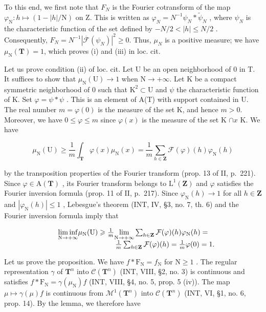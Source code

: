 To this end, we first note that \(F_{N}\) is the Fourier cotransform of the map \(\varphi_{\mathrm{N}}\colon h\mapsto(1-|h|/\mathrm{N})\) on Z. This is written as \(\varphi_{N}=N^{-1}\psi_{N}*\widetilde{\psi}_{N}\) , where \(\psi_{N}\) is the characteristic function of the set defined by \(-N/2<|h|\leqslant N/2\) . Consequently, \(F_{N}=N^{-1}|\overline{\mathcal{F}}(\psi_{N})|^{2}\geqslant0\). Thus, \(\mu_{N}\) is a positive measure; we have \(\mu_{\mathrm{N}}(\mathbf{T})=1\), which proves (i) and (iii) in loc. cit.

Let us prove condition (ii) of loc. cit. Let U be an open neighborhood of 0 in T. It suffices to show that \(\mu_{\mathrm{N}}(\mathrm{U}) \to 1\) when \(\mathrm{N} \to +\infty\). Let K be a compact symmetric neighborhood of 0 such that \(\mathrm{K}^2 \subset \mathrm{U}\) and \(\psi\) the characteristic function of K. Set \(\varphi = \psi * \psi\) . This is an element of A(T) with support contained in U. The real number \(m = \varphi(0)\) is the measure of the set K, and hence \(m > 0\). Moreover, we have \(0 \leqslant \varphi \leqslant m\) since \(\varphi(x)\) is the measure of the set K \(\cap x\) K. We have

\[
\mu_ {\mathrm{N}} (\mathrm{U}) \geqslant \frac {1}{m} \int_ {\mathbf {T}} \varphi (x) \mu_ {\mathrm{N}} (x) = \frac {1}{m} \sum_ {h \in \mathbf {Z}} \mathcal {F} (\varphi) (h) \varphi_ {\mathrm{N}} (h)
\]

by the transposition properties of the Fourier transform (prop. 13 of II, p.~221). Since \(\varphi \in \mathrm{A}(\mathbf{T})\) , its Fourier transform belongs to \(\mathrm{L}^1 (\mathbf{Z})\) and \(\varphi\) satisfies the Fourier inversion formula (prop. 11 of II, p.~217). Since \(\varphi_{\mathrm{N}}(h)\to 1\) for all \(h\in \mathbf{Z}\) and \(|\varphi_{\mathrm{N}}(h)|\leqslant 1\) , Lebesgue's theorem (INT, IV, §3, no. 7, th. 6) and the Fourier inversion formula imply that

\[
\begin{array}{r l} & {\underset {\mathrm{N} \to + \infty} {\liminf} \mu_ {\mathrm{N}} (\mathrm{U}) \geqslant \frac {1}{m} \underset {\mathrm{N} \to + \infty} {\lim} \sum_ {h \in \mathbf {Z}} \mathcal {F} (\varphi) (h) \varphi_ {\mathrm{N}} (h) =} \\ & {\qquad \qquad \qquad \qquad \frac {1}{m} \sum_ {h \in \mathbf {Z}} \mathcal {F} (\varphi) (h) = \frac {1}{m} \varphi (0) = 1.} \end{array}
\]

Let us prove the proposition. We have \(f * \mathrm{F}_{\mathrm{N}} = f_{\mathrm{N}}\) for \(\mathrm{N} \geqslant 1\) . The regular representation \(\gamma\) of \(\mathbf{T}^n\) into \(\mathcal{C}(\mathbf{T}^n)\) (INT, VIII, §2, no. 3) is continuous and satisfies \(f * \mathrm{F}_{\mathrm{N}} = \gamma(\mu_{\mathrm{N}})f\) (INT, VIII, §4, no. 5, prop. 5 (iv)). The map \(\mu \mapsto \gamma(\mu)f\) is continuous from \(\mathcal{M}^1(\mathbf{T}^n)\) into \(\mathcal{C}(\mathbf{T}^n)\) (INT, VI, §1, no. 6, prop. 14). By the lemma, we therefore have

